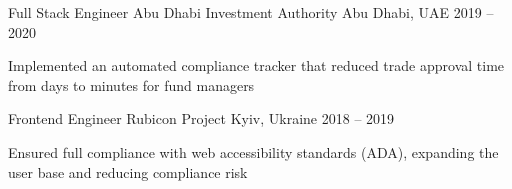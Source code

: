 \begin{cventries}
\entryskip
  \cventry
    {Full Stack Engineer} %
    {Abu Dhabi Investment Authority} %
    {Abu Dhabi, UAE} %
    {2019 -- 2020} %
    {
      \begin{cvitems} %
        \item {Implemented an automated compliance tracker that reduced trade approval time from days to minutes for fund managers}
      \end{cvitems}
    }

\entryskip
  \cventry
    {Frontend Engineer} %
    {Rubicon Project} %
    {Kyiv, Ukraine} %
    {2018 -- 2019} %
    {
      \begin{cvitems} %
        \item {Ensured full compliance with web accessibility standards (ADA), expanding the user base and reducing compliance risk}
      \end{cvitems}
    }

\end{cventries}
